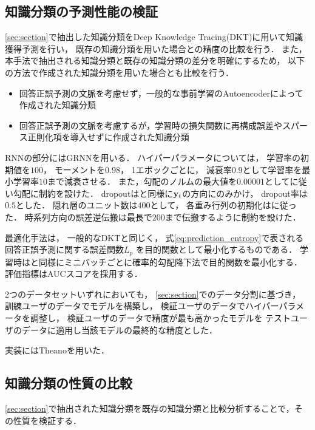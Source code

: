 \subsection{知識分類の予測性能の検証}

\ref{sec:section}で抽出した知識分類をDeep Knowledge Tracing(DKT)に用いて知識獲得予測を行い，
既存の知識分類を用いた場合との精度の比較を行う．
また，本手法で抽出される知識分類と既存の知識分類の差分を明確にするため，
以下の方法で作成された知識分類を用いた場合とも比較を行う．
\begin{itemize}
\item 回答正誤予測の文脈を考慮せず，一般的な事前学習のAutoencoderによって作成された知識分類\label{c1}
\item 回答正誤予測の文脈を考慮するが，学習時の損失関数に再構成誤差やスパース正則化項を導入せずに作成された知識分類\label{c2}
\end{itemize}

RNNの部分にはGRNNを用いる．
ハイパーパラメータについては，
学習率の初期値を$100$，
モーメントを$0.98$，
1エポックごとに，
減衰率$0.9$として学習率を最小学習率$10$まで減衰させる．
また，勾配のノルムの最大値を$0.00001$として\cite{pascanu2013difficulty}に従い勾配に制約を設けた．
dropoutは\cite{piech2015deep}と同様に${\bf y}_t$の方向にのみかけ，
dropout率は$0.5$とした．
隠れ層のユニット数は$400$として，
各重み行列の初期化は\cite{glorot2010understanding}に従った．
時系列方向の誤差逆伝搬は最長で$200$まで伝搬するように制約を設けた．

最適化手法は，
一般的なDKTと同じく，
式\ref{eq:prediction_entropy}で表される回答正誤予測に関する誤差関数$L_p$
を目的関数として最小化するものである．
学習時は\cite{piech2015deep}と同様にミニバッチごとに確率的勾配降下法で目的関数を最小化する．
評価指標はAUCスコアを採用する．

2つのデータセットいずれにおいても，
\ref{sec:section}でのデータ分割に基づき，
訓練ユーザのデータでモデルを構築し，
検証ユーザのデータでハイパーパラメータを調整し， 
検証ユーザのデータで精度が最も高かったモデルを
テストユーザのデータに適用し当該モデルの最終的な精度とした．

実装にはTheanoを用いた．


\subsection{知識分類の性質の比較}

\ref{sec:section}で抽出された知識分類を既存の知識分類と比較分析することで，その性質を検証する．

